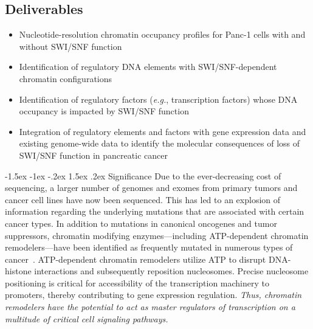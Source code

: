 \documentclass[11pt]{article}
\makeatletter
\renewcommand\section{\@startsection {section}{1}{\z@}%
{-1.5ex \@plus -1ex \@minus -.2ex}%
{1.5ex \@plus.2ex}%
{\color{dukeblue}\sffamily\Large\bfseries}}
\newcommand\panc{Panc\dash1\xspace}
\newcommand\eg{\emph{e.g.}\xspace}
\newcommand\dash{\nobreakdash-\hspace{0pt}}
\makeatother
\begin{document}
\begin{center}
\subsection*{\sffamily \color{dukeblue} Deliverables}
\end{center}
\begin{itemize}
\addtolength{\itemsep}{-2mm}
\item Nucleotide-resolution chromatin occupancy profiles for \panc cells with and without SWI/SNF function
\item Identification of regulatory DNA elements with SWI/SNF-dependent chromatin configurations
\item Identification of regulatory factors (\eg, transcription factors) whose DNA occupancy is impacted by SWI/SNF function
\item Integration of regulatory elements and factors with gene expression data and existing genome-wide data to identify the molecular consequences of loss of SWI/SNF function in pancreatic cancer

\end{itemize}

\pagebreak
 
\section{Significance}
 Due to the ever-decreasing cost of sequencing, a larger number of genomes and exomes from primary tumors and cancer cell lines have now been sequenced. This has led to an explosion of information regarding the underlying mutations that are associated with certain cancer types.  In addition to mutations in canonical oncogenes and tumor suppressors, chromatin modifying enzymes---including ATP-dependent chromatin remodelers---have been identified as frequently mutated in numerous types of cancer~\citep{Timp2013}.  ATP-dependent chromatin remodelers utilize ATP to disrupt DNA-histone interactions and subsequently reposition nucleosomes. Precise nucleosome positioning is critical for accessibility of the transcription machinery to promoters, thereby contributing to gene expression regulation. \emph{\color{dukeblue}Thus, chromatin remodelers have the potential to act as master regulators of transcription on a multitude of critical cell signaling pathways.}
\end{document}
